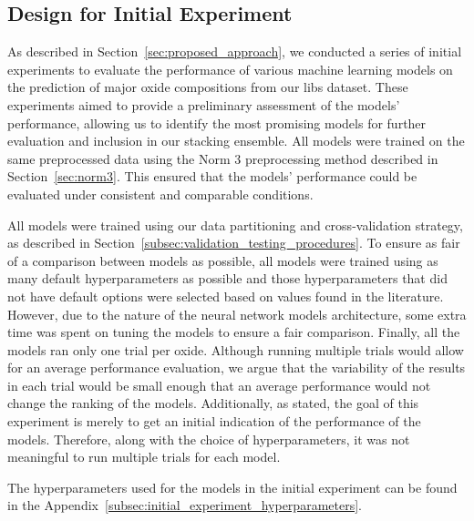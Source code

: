 \subsection{Design for Initial Experiment}\label{sec:initial-experiment}
As described in Section~\ref{sec:proposed_approach}, we conducted a series of initial experiments to evaluate the performance of various machine learning models on the prediction of major oxide compositions from our \gls{libs} dataset.
These experiments aimed to provide a preliminary assessment of the models' performance, allowing us to identify the most promising models for further evaluation and inclusion in our stacking ensemble.
All models were trained on the same preprocessed data using the Norm 3 preprocessing method described in Section~\ref{sec:norm3}.
This ensured that the models' performance could be evaluated under consistent and comparable conditions.

All models were trained using our data partitioning and cross-validation strategy, as described in Section~\ref{subsec:validation_testing_procedures}. 
To ensure as fair of a comparison between models as possible, all models were trained using as many default hyperparameters as possible and those hyperparameters that did not have default options were selected based on values found in the literature.
However, due to the nature of the neural network models architecture, some extra time was spent on tuning the models to ensure a fair comparison.
Finally, all the models ran only one trial per oxide. 
Although running multiple trials would allow for an average performance evaluation, we argue that the variability of the results in each trial would be small enough that an average performance would not change the ranking of the models. 
Additionally, as stated, the goal of this experiment is merely to get an initial indication of the performance of the models.
Therefore, along with the choice of hyperparameters, it was not meaningful to run multiple trials for each model.


The hyperparameters used for the models in the initial experiment can be found in the Appendix~\ref{subsec:initial_experiment_hyperparameters}.